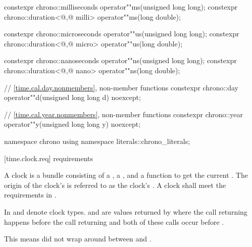 \begin{codeblock}
{{{    constexpr chrono::milliseconds                 operator""ms(unsigned long long);
    constexpr chrono::duration<@\unspec,@ milli> operator""ms(long double);

    constexpr chrono::microseconds                 operator""us(unsigned long long);
    constexpr chrono::duration<@\unspec,@ micro> operator""us(long double);

    constexpr chrono::nanoseconds                 operator""ns(unsigned long long);
    constexpr chrono::duration<@\unspec,@ nano> operator""ns(long double);

    // \ref{time.cal.day.nonmembers}, non-member functions
    constexpr chrono::day  operator""d(unsigned long long d) noexcept;

    // \ref{time.cal.year.nonmembers}, non-member functions
    constexpr chrono::year operator""y(unsigned long long y) noexcept;
  }
  }

  namespace chrono {
    using namespace literals::chrono_literals;
  }
}
\end{codeblock}

[time.clock.req]{ requirements}

%
\pnum
A clock is a bundle consisting of a , a
, and a function  to get the current .
The origin of the clock's  is referred to as the clock's .
 A clock shall meet the requirements in .

\pnum
In   and  denote clock types.  and
 are values returned by  where the call returning  happens
before the call returning  and both of these calls
occur
before .
\begin{note}
This means  did not wrap around between  and
.
\end{note}

